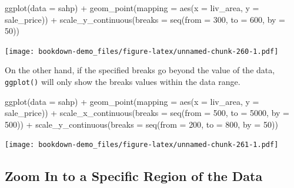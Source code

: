 \documentclass[
]{book}
\newenvironment{Shaded}{\begin{snugshade}}{\end{snugshade}}
\newcommand{\AttributeTok}[1]{\textcolor[rgb]{0.77,0.63,0.00}{#1}}
\newcommand{\DecValTok}[1]{\textcolor[rgb]{0.00,0.00,0.81}{#1}}
\newcommand{\FunctionTok}[1]{\textcolor[rgb]{0.00,0.00,0.00}{#1}}
\newcommand{\NormalTok}[1]{#1}
\newcommand{\SpecialCharTok}[1]{\textcolor[rgb]{0.00,0.00,0.00}{#1}}
\begin{document}
\begin{Shaded}
\begin{Highlighting}[]
\FunctionTok{ggplot}\NormalTok{(}\AttributeTok{data =}\NormalTok{ sahp) }\SpecialCharTok{+} \FunctionTok{geom\_point}\NormalTok{(}\AttributeTok{mapping =} \FunctionTok{aes}\NormalTok{(}\AttributeTok{x =}\NormalTok{ liv\_area, }\AttributeTok{y =}\NormalTok{ sale\_price)) }\SpecialCharTok{+}
  \FunctionTok{scale\_y\_continuous}\NormalTok{(}\AttributeTok{breaks =} \FunctionTok{seq}\NormalTok{(}\AttributeTok{from =} \DecValTok{300}\NormalTok{, }\AttributeTok{to =} \DecValTok{600}\NormalTok{, }\AttributeTok{by =} \DecValTok{50}\NormalTok{))}
\end{Highlighting}
\end{Shaded}

\texttt{[image: bookdown-demo\_files/figure-latex/unnamed-chunk-260-1.pdf]}

On the other hand, if the specified breaks go beyond the value of the data, \texttt{ggplot()} will only show the breaks values within the data range.

\begin{Shaded}
\begin{Highlighting}[]
\FunctionTok{ggplot}\NormalTok{(}\AttributeTok{data =}\NormalTok{ sahp) }\SpecialCharTok{+} \FunctionTok{geom\_point}\NormalTok{(}\AttributeTok{mapping =} \FunctionTok{aes}\NormalTok{(}\AttributeTok{x =}\NormalTok{ liv\_area, }\AttributeTok{y =}\NormalTok{ sale\_price)) }\SpecialCharTok{+}
  \FunctionTok{scale\_x\_continuous}\NormalTok{(}\AttributeTok{breaks =} \FunctionTok{seq}\NormalTok{(}\AttributeTok{from =} \DecValTok{500}\NormalTok{, }\AttributeTok{to =} \DecValTok{5000}\NormalTok{, }\AttributeTok{by =} \DecValTok{500}\NormalTok{)) }\SpecialCharTok{+}
  \FunctionTok{scale\_y\_continuous}\NormalTok{(}\AttributeTok{breaks =} \FunctionTok{seq}\NormalTok{(}\AttributeTok{from =} \DecValTok{200}\NormalTok{, }\AttributeTok{to =} \DecValTok{800}\NormalTok{, }\AttributeTok{by =} \DecValTok{50}\NormalTok{))}
\end{Highlighting}
\end{Shaded}

\texttt{[image: bookdown-demo\_files/figure-latex/unnamed-chunk-261-1.pdf]}

\hypertarget{zoom-in-to-a-specific-region-of-the-data}{%
\subsection{Zoom In to a Specific Region of the Data}\label{zoom-in-to-a-specific-region-of-the-data}}
\end{document}
